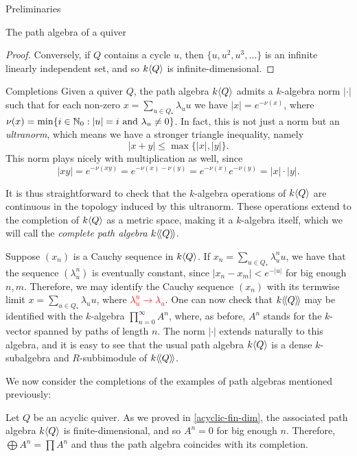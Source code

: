 \begin{chapter}{Preliminaries}
\begin{section}{The path algebra of a quiver}
\begin{proof}
Conversely, if $Q$ contains a cycle $u$, then $\{u,u^2,u^3,\dots\}$ is an infinite linearly independent set, and so $k\langle Q\rangle$ is infinite-dimensional.
\end{proof}
\end{section}

\begin{section}{Completions}
Given a quiver $Q$, the path algebra $k\langle Q\rangle$ admits a $k$-algebra norm $\vert \cdot \vert$ such that for each non-zero $x=\sum_{u\in Q_*} \lambda_u u$ we have $\vert x\vert = e^{-\nu(x)}$, where $\nu(x) = \min\{ i\in \mathbb{N}_0 : |u| = i \text{ and } \lambda_u \neq 0 \}$. In fact, this is not just a norm but an \emph{ultranorm}, which means we have a stronger triangle inequality, namely \[|x+y|\leq \max\{|x|,|y|\}.\] This norm plays nicely with multiplication as well, since \[|xy|=e^{-\nu(xy)}=e^{-\nu(x)-\nu(y)} = e^{-\nu(x)}e^{-\nu(y)}=|x|\cdot|y|.\]

It is thus straightforward to check that the $k$-algebra operations of $k\langle Q\rangle$ are continuous in the topology induced by this ultranorm. These operations extend to the completion of $k\langle Q\rangle$ as a metric space, making it a $k$-algebra itself, which we will call the \emph{complete path algebra} $k\langle\!\langle Q\rangle\!\rangle$.

Suppose $(x_n)$ is a Cauchy sequence in $k\langle Q\rangle$. If $x_n=\sum_{u\in Q_*} \lambda_u^n u$, we have that the sequence $(\lambda_u^n)$ is eventually constant, since $|x_n-x_m|<e^{-|u|}$ for big enough $n,m$. Therefore, we may identify the Cauchy sequence $(x_n)$ with its termwise limit $x=\sum_{u\in Q_*} \lambda_u u$, where \textcolor{red}{$\lambda_u^n \to \lambda_u$}. One can now check that $k\langle\!\langle Q\rangle\!\rangle$ may be identified with the $k$-algebra $\prod_{n=0}^\infty A^n$, where, as before, $A^n$ stands for the $k$-vector spanned by paths of length $n$. The norm $|\cdot|$ extends naturally to this algebra, and it is easy to see that the usual path algebra $k\langle Q\rangle$ is a dense $k$-subalgebra and $R$-subbimodule of $k\langle\!\langle Q\rangle\!\rangle$.

We now consider the completions of the examples of path algebras mentioned previously:

\begin{exmp}Let $Q$ be an acyclic quiver. As we proved in \ref{acyclic-fin-dim}, the associated path algebra $k\langle Q\rangle$ is finite-dimensional, and so $A^n=0$ for big enough $n$. Therefore, $\bigoplus A^n=\prod A^n$ and thus the path algebra coincides with its completion.
\end{exmp}


\end{section}
\end{chapter}
